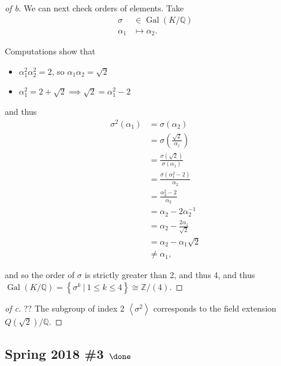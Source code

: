 \begin{solution}
\begin{proof}[of b]
We can next check orders of elements. Take
\begin{align*}
\sigma &\in \operatorname{Gal}(K/{\mathbb{Q}}) \\
\alpha_1 &\mapsto \alpha_2
.\end{align*}

Computations show that

\begin{itemize}
\tightlist
\item
  \(\alpha_1^2 \alpha_2^2 = 2\), so \(\alpha_1 \alpha_2 = \sqrt 2\)
\item
  \(\alpha_1^2 = 2 + \sqrt 2 \implies \sqrt 2 = \alpha_1^2 - 2\)
\end{itemize}

and thus
\begin{align*}
\sigma^2(\alpha_1) &= \sigma(\alpha_2) \\
&= \sigma\left(\frac{\sqrt 2}{\alpha_1}\right) \\
&= \frac{\sigma(\sqrt 2)}{\sigma(\alpha_1)} \\
&= \frac{\sigma(\alpha_1^2 - 2)}{\alpha_2} \\
&= \frac{\alpha_2^2 - 2}{\alpha_2} \\
&= \alpha_2 -2\alpha_2^{-1}\\
&= \alpha_2 - \frac{2\alpha_1}{\sqrt 2} \\
&= \alpha_2 -\alpha_1 \sqrt 2 \\
&\neq \alpha_1
,\end{align*}

and so the order of \(\sigma\) is strictly greater than 2, and thus 4,
and thus
\(\operatorname{Gal}(K/{\mathbb{Q}}) = \left\{{\sigma^k {~\mathrel{\Big|}~}1\leq k \leq 4}\right\} \cong {\mathbb{Z}}/(4)\).

\end{proof}

\begin{proof}[of c]

?? The subgroup of index 2 \(\left\langle{\sigma^2}\right\rangle\)
corresponds to the field extension \(Q(\sqrt 2) / {\mathbb{Q}}\).

\end{proof}


\end{solution}

\hypertarget{spring-2018-3-done}{%
\subsection{\texorpdfstring{Spring 2018 \#3
\(\done\)}{Spring 2018 \#3 \textbackslash done}}\label{spring-2018-3-done}}

